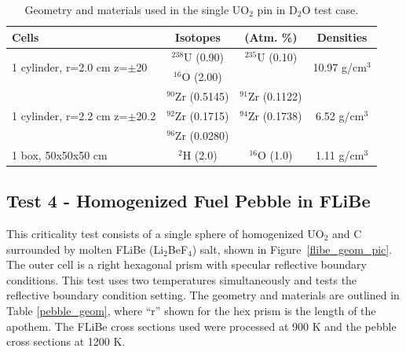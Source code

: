 \documentclass[preprint,12pt]{elsarticle}
\begin{document}
\begin{table}[h]
\centering
\caption{Geometry and materials used in the single UO$_2$ pin in D$_2$O test case.}
\label{uo2_pincell_geom}
\begin{tabular}{| l | c  c | c |}
\hline
Cells & Isotopes & (Atm. \%)& Densities \\
\hline
\multirow{2}{*}{1 cylinder, r=2.0 cm z=$\pm$20 }  &   $^{238}$U   (0.90) &  $^{235}$U   (0.10) &  \multirow{2}{*}{10.97 g/cm$^3$} \\
                                                                              &   $^{16}$O    (2.00)  &                              &  \\
\hline
\multirow{3}{*}{1 cylinder, r=2.2 cm z=$\pm$20.2}  &   $^{90}$Zr   (0.5145) &  $^{91}$Zr   (0.1122)&  \multirow{3}{*}{6.52 g/cm$^3$} \\
                                                   &   $^{92}$Zr   (0.1715) &  $^{94}$Zr   (0.1738)& \\
                                                   &   $^{96}$Zr   (0.0280) &                      & \\
\hline
\multirow{1}{*}{1 box, 50x50x50 cm }  &    $^{2}$H   (2.0) & $^{16}$O   (1.0) &   \multirow{1}{*}{1.11 g/cm$^3$} \\
\hline
\end{tabular}
\end{table}



\newpage
\subsection{Test 4 - Homogenized Fuel Pebble in FLiBe}

This criticality test consists of a single sphere of homogenized UO$_2$ and C surrounded by molten FLiBe (Li$_2$BeF$_4$) salt, shown in Figure~\ref{flibe_geom_pic}.  The outer cell is a right hexagonal prism with specular reflective boundary conditions.  This test uses two temperatures simultaneously and tests the reflective boundary condition setting.  The geometry and materials are outlined in Table \ref{pebble_geom}, where ``r'' shown for the hex prism is the length of the apothem.  The FLiBe cross sections used were processed at 900 K and the pebble cross sections at 1200 K.
\end{document}
